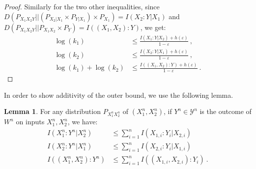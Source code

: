 \documentclass[11pt]{article}
\theoremstyle{definition}
\newtheorem{lem}[theo]{Lemma}
\theoremstyle{remark}
\begin{document}
\begin{proof}
    Similarly for the two other inequalities, since $D\left(P_{X_1X_2Y}||\left(P_{X_2|X_1} \times P_{Y|X_1} \right) \times P_{X_1}\right) = I(X_2:Y|X_1)$ and $D\left(P_{X_1X_2Y}||P_{X_1X_2} \times P_Y \right) =  I((X_1,X_2):Y)$, we get:
    \begin{equation}
      \begin{aligned}
        \log(k_1) &\leq \frac{I(X_1:Y|X_2)+h(\varepsilon)}{1-\varepsilon} \ ,\\
        \log(k_2) &\leq \frac{I(X_2:Y|X_1)+h(\varepsilon)}{1-\varepsilon} \ ,\\
        \log(k_1)+\log(k_2) &\leq \frac{I((X_1,X_2):Y)+h(\varepsilon)}{1-\varepsilon} \ .
      \end{aligned}
    \end{equation}
  \end{proof}

In order to show additivity of the outer bound, we use the following lemma.

  \begin{lem}
    \label{lem:multiletterOB}
     For any distribution $P_{X_1^nX_2^n}$ of $(X_1^n,X_2^n)$, if $Y^n \in \mathcal{Y}^n$ is the outcome of $W^n$ on inputs $X_1^n,X_2^n$, we have:
      \begin{equation}
        \begin{aligned}
          I(X_1^n:Y^n|X_2^n) &\leq \sum_{i=1}^n I(X_{1,i}:Y_i|X_{2,i})\\
          I(X_2^n:Y^n|X_1^n) &\leq \sum_{i=1}^n I(X_{2,i}:Y_i|X_{1,i})\\
          I((X_1^n,X_2^n):Y^n) &\leq \sum_{i=1}^n I((X_{1,i},X_{2,i}):Y_i) \ .
        \end{aligned}
      \end{equation}
  \end{lem}
  
\end{document}
